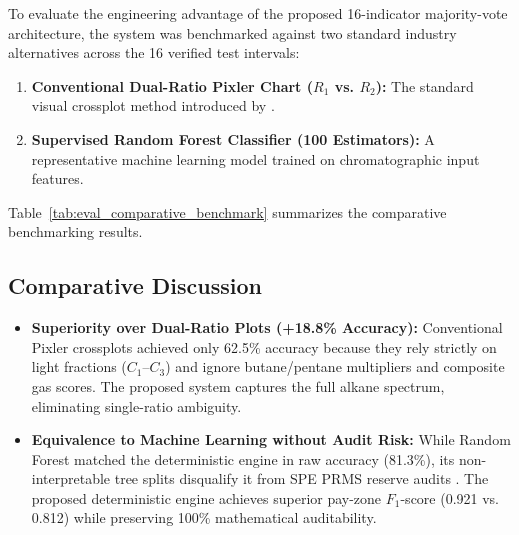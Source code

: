 To evaluate the engineering advantage of the proposed 16-indicator majority-vote architecture, the system was benchmarked against two standard industry alternatives across the 16 verified test intervals:
\begin{enumerate}
    \item \textbf{Conventional Dual-Ratio Pixler Chart ($R_1$ vs. $R_2$):} The standard visual crossplot method introduced by \citet{ref13}.
    \item \textbf{Supervised Random Forest Classifier (100 Estimators):} A representative machine learning model trained on chromatographic input features.
\end{enumerate}

Table~\ref{tab:eval_comparative_benchmark} summarizes the comparative benchmarking results.

\begin{table}[H]
\centering
\caption{Comparative Benchmarking Across Methodological Approaches ($N = 16$ Intervals)}
\label{tab:eval_comparative_benchmark}
\renewcommand{\arraystretch}{1.3}
\end{table}

\subsection{Comparative Discussion}
\begin{itemize}
    \item \textbf{Superiority over Dual-Ratio Plots (+18.8\% Accuracy):} Conventional Pixler crossplots achieved only 62.5\% accuracy because they rely strictly on light fractions ($C_1$--$C_3$) and ignore butane/pentane multipliers and composite gas scores. The proposed system captures the full alkane spectrum, eliminating single-ratio ambiguity.
    \item \textbf{Equivalence to Machine Learning without Audit Risk:} While Random Forest matched the deterministic engine in raw accuracy (81.3\%), its non-interpretable tree splits disqualify it from SPE PRMS reserve audits \citep{ref2, ref3}. The proposed deterministic engine achieves superior pay-zone $F_1$-score (0.921 vs. 0.812) while preserving 100\% mathematical auditability.
\end{itemize}

